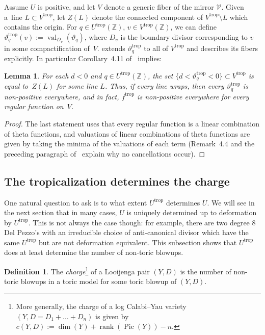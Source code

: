 \documentclass[10pt,a4paper]{amsart}
\numberwithin{equation}{section}
\numberwithin{figure}{section}
\numberwithin{table}{section}
\DeclareMathOperator{\Pic}{Pic}
\DeclareMathOperator{\rank}{rank}
\DeclareMathOperator{\val}{val}
\DeclareMathOperator{\trop}{trop}
\let\bb=\mathbb
\let\s=\mathcal
\newtheorem{lem}[thm]{Lemma}
\theoremstyle{definition}
\newtheorem{dfn}[thm]{Definition}
\begin{document}
Assume $U$ is positive, and let $V$ denote a generic fiber of the mirror $\s{V}$. Given a~line \mbox{$L\subset V^{\trop}$}, let $Z(L)$ denote the connected component of $V^{\trop}\setminus L$ which contains the origin. For $q\in U^{\trop}(\bb{Z})$, $v\in V^{\trop}(\bb{Z})$, we can define $\vartheta_q^{\trop}(v):=\val_{D_v}(\vartheta_q)$, where $D_v$ is the boundary divisor corresponding to $v$ in some compactification of~$V$. \cite{Man1} extends $\vartheta_q^{\trop}$ to all of $V^{\trop}$ and describes its fibers explicitly. In particular Corollary~4.11 of~\cite{Man1} implies:
\begin{lem}\label{NegativeFibers}
For each $d<0$ and $q\in U^{\trop}(\bb{Z})$, the set $\big\{d<\vartheta_q^{\trop}<0\big\}\subset V^{\trop}$ is equal to~$Z(L)$ for some line $L$. Thus, if every line wraps, then every $\vartheta_q^{\trop}$ is non-positive everywhere, and in fact, $f^{\trop}$ is non-positive everywhere for every regular function on~$V$.
\end{lem}
\begin{proof}
The last statement uses that every regular function is a linear combination of theta functions, and valuations of linear combinations of theta functions are given by taking the minima of the valuations of each term (Remark~4.4 and the preceding paragraph of~\cite{Man1} explain why no cancellations occur).
\end{proof}

\subsection{The tropicalization determines the charge}\label{trop-charge}

One natural question to ask is to what extent $U^{\trop}$ determines $U$. We will see in the next section that in many cases, $U$ is uniquely determined up to deformation by $U^{\trop}$. This is not always the case though: for example, there are two degree $8$ Del Pezzo's with an irreducible choice of anti-canonical divisor which have the same $U^{\trop}$ but are not deformation equivalent. This subsection shows that $U^{\trop}$ does at least determine the number of non-toric blowups.

\begin{dfn}The {\it charge}\footnote{More generally, the charge of a log Calabi--Yau variety $(Y,D=D_1+\dots+D_n)$ is given by $c(Y,D):=\dim(Y)+\rank(\Pic(Y))-n$.} of a Looijenga pair $(Y,D)$ is the number of non-toric blowups in a toric model for some toric blowup of $(Y,D)$.
\end{dfn}
\end{document}
